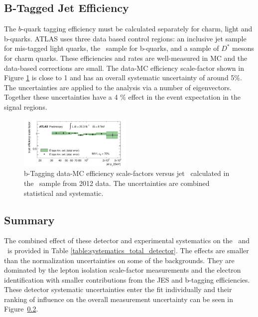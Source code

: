 \subsection{B-Tagged Jet Efficiency}

The $b$-quark tagging efficiency must be calculated separately for charm, light and b-quarks. ATLAS uses three data based control regions: an inclusive jet sample for mis-tagged light quarks\cite{mistagratecalibration}, the \ttbar\ sample for b-quarks\cite{bjetcalibration}, and a sample of $D^{*}$ mesons for charm quarks\cite{cjetcalibration}. These efficiencies and rates are well-measured in MC and the data-based corrections are small. The data-MC efficiency scale-factor shown in Figure \ref{figure:systematics_b} is close to 1 and has an overall systematic uncertainty of around 5\%. The uncertainties are applied to the analysis via a number of eigenvectors. Together these uncertainties have a 4 \% effect in the event expectation in the signal regions. 

\begin{figure}[htbp]
\begin{center}
\includegraphics[width=0.48\textwidth]{figs/systematics/ttbartopo}
\caption{b-Tagging data-MC efficiency scale-factors versus jet \pt\ calculated in the \ttbar\ sample from 2012 data. The uncertainties are combined statistical and systematic.} 
\label{figure:systematics_b}
\end{center}
\end{figure}


\subsection{Summary}

The combined effect of these detector and experimental systematics on the \ttV\ and \tth\ is provided in Table \ref{table:systematics_total_detector}. The effects are smaller than the normalization uncertainties on some of the backgrounds. They are dominated by the lepton isolation scale-factor measurements and the electron identification with smaller contributions from the JES and b-tagging efficiencies. These detector systematic uncertainties enter the fit individually and their ranking of influence on the overall measurement uncertainty can be seen in Figure~\ref{}.

